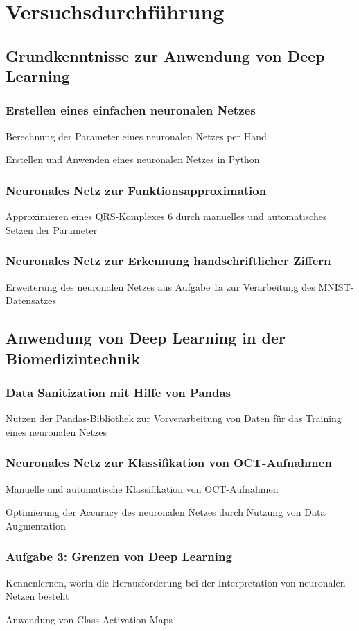 \documentclass[a4paper,12pt,titlepage]{scrartcl}
\begin{document}
\section{Versuchsdurchführung}
\subsection{Grundkenntnisse zur Anwendung von Deep Learning}
\subsubsection{Erstellen eines einfachen neuronalen Netzes}
Berechnung der Parameter eines neuronalen Netzes per Hand

Erstellen und Anwenden eines neuronalen Netzes in Python

\subsubsection{Neuronales Netz zur Funktionsapproximation}
Approximieren eines QRS-Komplexes 6 durch manuelles und automatisches Setzen der Parameter

\subsubsection{Neuronales Netz zur Erkennung handschriftlicher Ziffern}
Erweiterung des neuronalen Netzes aus Aufgabe 1a zur Verarbeitung des MNIST-Datensatzes

\subsection{Anwendung von Deep Learning in der Biomedizintechnik}
\subsubsection{Data Sanitization mit Hilfe von Pandas}
Nutzen der Pandas-Bibliothek zur Vorverarbeitung von Daten für das Training eines neuronalen Netzes

\subsubsection{Neuronales Netz zur Klassifikation von OCT-Aufnahmen}
Manuelle und automatische Klassifikation von OCT-Aufnahmen

Optimierung der Accuracy des neuronalen Netzes durch Nutzung von Data Augmentation

\subsubsection{Aufgabe 3: Grenzen von Deep Learning}
Kennenlernen, worin die Herausforderung bei der Interpretation von neuronalen Netzen besteht

Anwendung von Class Activation Maps
\end{document}
